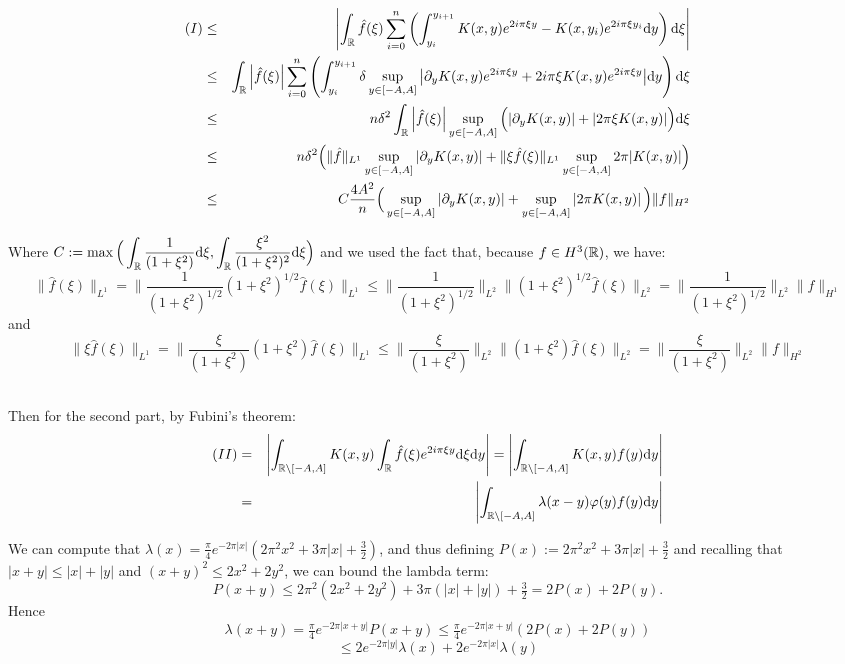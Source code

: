 \documentclass[11pt,a4paper]{article}
\begin{document}
\begin{eqnarray*}
(I) &\leq&  \left|  \int_\mathbb R \hat{f}(\xi)  \sum_{i=0}^n \left(\int_{y_i}^{y_{i+1}} K(x,y)e^{2i\pi\xi y} - K(x,y_i) e^{2i\pi\xi y_i}\mathrm{d}y \right)\mathrm{d}\xi \right| \\
&\leq&   \int_\mathbb R \left| \hat{f}(\xi) \right|  \sum_{i=0}^n \left(\int_{y_i}^{y_{i+1}}  \delta \sup_{y\in[-A,A]} {\left|\partial_yK(x,y)e^{2i\pi\xi y} +2i\pi\xi K(x,y)e^{2i\pi\xi y} \right|} \mathrm{d}y \right)\mathrm{d}\xi \\
&\leq&  n  \delta^2  \int_\mathbb R \left| \hat{f}(\xi) \right|  \sup_{y\in[-A,A]}\Big( {\left|\partial_yK(x,y)\right|+ \left|2\pi\xi K(x,y)\right|}\Big) \mathrm{d}\xi \\
&\leq&  n  \delta^2 \Big(\| \hat{f}\|_{L^1}  \sup_{y\in[-A,A]}{\left|\partial_yK(x,y)\right|} +  \| \xi\hat{f}(\xi)\|_{L^1} \sup_{y\in[-A,A]}{2\pi|K(x,y)|} \Big) \\
&\leq&  C\frac{4A^2}{n}  \Big(\sup_{y\in[-A,A]}\left|\partial_yK(x,y)\right| + \sup_{y\in[-A,A]}\left|2\pi K(x,y)\right| \Big) \| f\|_{H^2} \\
\end{eqnarray*}

Where $C := \max\Big(\displaystyle \int_\mathbb R \frac{1}{(1+\xi^2)} \mathrm{d}\xi,\int_\mathbb R \frac{\xi^2}{(1+\xi^2)^2} \mathrm{d}\xi\Big)$ and we used the fact that, because $f\in H^3(\mathbb R)$, we have: \[\| \hat{f}(\xi)\|_{L^1} = \| \frac{1}{(1+\xi^2)^{1/2}}(1+\xi^2)^{1/2}\hat{f}(\xi)\|_{L^1} \leq \| \frac{1}{(1+\xi^2)^{1/2}}\|_{L^2} \|(1+\xi^2)^{1/2}\hat{f}(\xi)\|_{L^2} = \| \frac{1}{(1+\xi^2)^{1/2}}\|_{L^2} \| f\|_{H^1}  \] 
and  \[\| \xi\hat{f}(\xi)\|_{L^1} = \| \frac{\xi}{(1+\xi^2)}(1+\xi^2)\hat{f}(\xi)\|_{L^1} \leq \| \frac{\xi}{(1+\xi^2)}\|_{L^2} \|(1+\xi^2)\hat{f}(\xi)\|_{L^2} = \| \frac{\xi}{(1+\xi^2)}\|_{L^2} \| f\|_{H^2}  \] 

~\\
Then for the second part, by Fubini's theorem:
\begin{eqnarray*}
(II) &=&  \left|\int_{\mathbb R \setminus [-A,A]} K(x,y) \int_\mathbb R \hat{f}(\xi) e^{2i\pi\xi y}\mathrm{d}\xi \mathrm{d}y\right|  =\left| \int_{\mathbb R \setminus [-A,A]} K(x,y) f(y)\mathrm{d}y \right|  \\
&=& \left| \int_{\mathbb R \setminus [-A,A]} \lambda(x-y)\varphi(y) f(y)\mathrm{d}y \right| 
\end{eqnarray*}

We can compute that $\lambda(x)=\frac{\pi}{4}e^{-2\pi \lvert x\rvert}\left(2\pi^2x^2+3\pi \lvert x\rvert +\frac{3}{2}\right)$, and thus defining $P(x):=2\pi^2x^2+3\pi|x|+\tfrac32$ and recalling that  \(|x+y|\le|x|+|y|\) and \((x+y)^2\le2x^2+2y^2\), we can bound the lambda term:
\[
P(x+y)
\le2\pi^2(2x^2+2y^2)+3\pi(|x|+|y|)+\tfrac32
=2P(x)+2P(y).
\]
Hence
\[
\lambda(x+y)
=\tfrac\pi4e^{-2\pi|x+y|}P(x+y)
\le\tfrac\pi4e^{-2\pi|x+y|}(2P(x)+2P(y))
\]
\[
\leq 2e^{-2\pi|y|}\lambda(x)+2e^{-2\pi|x|}\lambda(y)
\]
\end{document}
